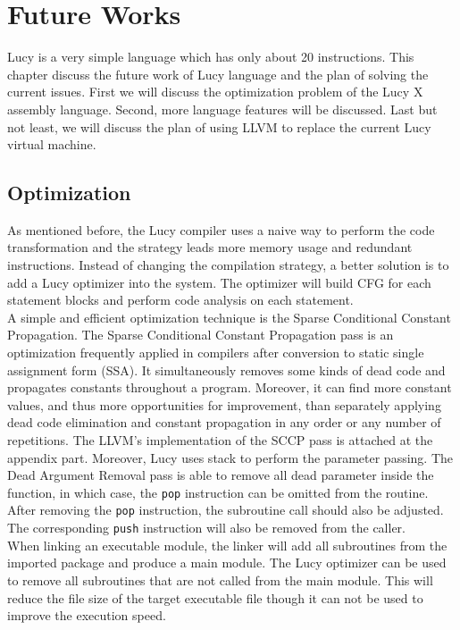 \chapter{Future Works}
Lucy is a very simple language which has only about 20 instructions. This chapter discuss the future work of Lucy language and the plan of solving the current issues. First we will discuss the optimization problem of the Lucy X assembly language. Second, more language features will be discussed. Last but not least, we will discuss the plan of using LLVM to replace the current Lucy virtual machine.


\section{Optimization}
As mentioned before, the Lucy compiler uses a naive way to perform the code transformation and the strategy leads more memory usage and redundant instructions. Instead of changing the compilation strategy, a better solution is to add a Lucy optimizer into the system. The optimizer will build CFG for each statement blocks and perform code analysis on each statement. \\
A simple and efficient optimization technique is the Sparse Conditional Constant Propagation. The Sparse Conditional Constant Propagation pass is an optimization frequently applied in compilers after conversion to static single assignment form (SSA). It simultaneously removes some kinds of dead code and propagates constants throughout a program. Moreover, it can find more constant values, and thus more opportunities for improvement, than separately applying dead code elimination and constant propagation in any order or any number of repetitions. The LLVM's implementation of the SCCP pass is attached at the appendix part.
Moreover, Lucy uses stack to perform the parameter passing. The Dead Argument Removal pass is able to remove all dead parameter inside the function, in which case, the \texttt{pop} instruction can be omitted from the routine. After removing the \texttt{pop} instruction, the subroutine call should also be adjusted. The corresponding \texttt{push} instruction will also be removed from the caller. \\
When linking an executable module, the linker will add all subroutines from the imported package and produce a main module. The Lucy optimizer can be used to remove all subroutines that are not called from the main module. This will reduce the file size of the target executable file though it can not be used to improve the execution speed.


